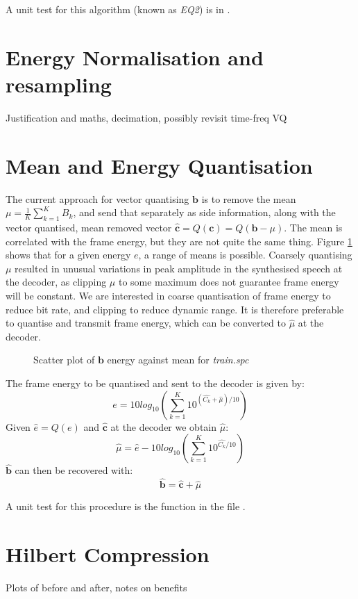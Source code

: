 \documentclass{article}
\begin{document}
A unit test for this algorithm (known as \emph{EQ2}) is in .

\section{Energy Normalisation and resampling}

Justification and maths, decimation, possibly revisit time-freq VQ

\section{Mean and Energy Quantisation}

The current approach for vector quantising $\mathbf{b}$ is to remove the mean $\mu=\frac{1}{K} \sum_{k=1}^K B_k$, and send that separately as side information, along with the vector quantised, mean removed vector $\hat{\mathbf{c}}=Q(\mathbf{c})=Q(\mathbf{b}-\mu)$.  The mean is correlated with the frame energy, but they are not quite the same thing.  Figure \ref{fig:train_e_mean} shows that for a given energy $e$, a range of means is possible. Coarsely quantising $\mu$ resulted in unusual variations in peak amplitude in the synthesised speech at the decoder, as clipping $\mu$ to some maximum does not guarantee frame energy will be constant.  We are interested in coarse quantisation of frame energy to reduce bit rate, and clipping to reduce dynamic range.  It is therefore preferable to quantise and transmit frame energy, which can be converted to $\hat{\mu}$ at the decoder.

\begin{figure}[h]
\caption{Scatter plot of $\mathbf{b}$ energy against mean for \emph{train.spc}}
\label{fig:train_e_mean}
\begin{center}

\end{center}
\end{figure}

The frame energy to be quantised and sent to the decoder is given by:
\begin{equation}
e = 10log_{10}\left( \sum_{k=1}^K 10^{ (\hat{C_k}+\hat{\mu})/10 } \right)
\end{equation}
Given $\hat{e}=Q(e)$ and $\hat{\mathbf{c}}$ at the decoder we obtain $\hat{\mu}$:
\begin{equation}
\hat{\mu} = \hat{e} - 10log_{10}\left( \sum_{k=1}^K 10^{\hat{C_k}/10} \right)
\end{equation}
$\hat{\mathbf{b}}$ can then be recovered with:
\begin{equation}
\hat{\mathbf{b}} = \hat{\mathbf{c}} + \hat{\mu}
\end{equation}

A unit test for this procedure is the function  in the file .

\section{Hilbert Compression}

Plots of before and after, notes on benefits



\end{document}
